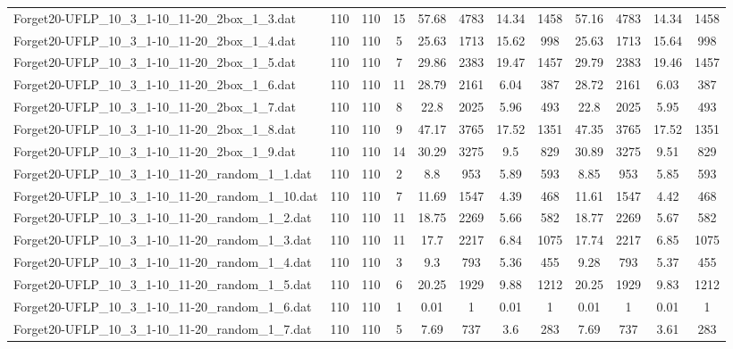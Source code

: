 \begin{sidewaystable}[!ht]
{\begin{tabular}{lccccccccccc}
Forget20-UFLP\_10\_3\_1-10\_11-20\_2box\_1\_3.dat & 110 & 110 & 15 & 57.68 & 4783 & 14.34 & 1458 & 57.16 & 4783 & 14.34 & 1458 \\
Forget20-UFLP\_10\_3\_1-10\_11-20\_2box\_1\_4.dat & 110 & 110 & 5 & 25.63 & 1713 & 15.62 & 998 & 25.63 & 1713 & 15.64 & 998 \\
Forget20-UFLP\_10\_3\_1-10\_11-20\_2box\_1\_5.dat & 110 & 110 & 7 & 29.86 & 2383 & 19.47 & 1457 & 29.79 & 2383 &  \textcolor{blue2}{19.46} & 1457 \\
Forget20-UFLP\_10\_3\_1-10\_11-20\_2box\_1\_6.dat & 110 & 110 & 11 & 28.79 & 2161 & 6.04 & 387 & 28.72 & 2161 & 6.03 & 387 \\
Forget20-UFLP\_10\_3\_1-10\_11-20\_2box\_1\_7.dat & 110 & 110 & 8 & 22.8 & 2025 & 5.96 & 493 & 22.8 & 2025 &  \textcolor{blue2}{5.95} & 493 \\
Forget20-UFLP\_10\_3\_1-10\_11-20\_2box\_1\_8.dat & 110 & 110 & 9 & 47.17 & 3765 &  \textcolor{blue2}{17.52} & 1351 & 47.35 & 3765 &  \textcolor{blue2}{17.52} & 1351 \\
Forget20-UFLP\_10\_3\_1-10\_11-20\_2box\_1\_9.dat & 110 & 110 & 14 & 30.29 & 3275 & 9.5 & 829 & 30.89 & 3275 & 9.51 & 829 \\
Forget20-UFLP\_10\_3\_1-10\_11-20\_random\_1\_1.dat & 110 & 110 & 2 & 8.8 & 953 & 5.89 & 593 & 8.85 & 953 &  \textcolor{blue2}{5.85} & 593 \\
Forget20-UFLP\_10\_3\_1-10\_11-20\_random\_1\_10.dat & 110 & 110 & 7 & 11.69 & 1547 & 4.39 & 468 & 11.61 & 1547 & 4.42 & 468 \\
Forget20-UFLP\_10\_3\_1-10\_11-20\_random\_1\_2.dat & 110 & 110 & 11 & 18.75 & 2269 & 5.66 & 582 & 18.77 & 2269 & 5.67 & 582 \\
Forget20-UFLP\_10\_3\_1-10\_11-20\_random\_1\_3.dat & 110 & 110 & 11 & 17.7 & 2217 & 6.84 & 1075 & 17.74 & 2217 & 6.85 & 1075 \\
Forget20-UFLP\_10\_3\_1-10\_11-20\_random\_1\_4.dat & 110 & 110 & 3 & 9.3 & 793 &  \textcolor{blue2}{5.36} & 455 & 9.28 & 793 & 5.37 & 455 \\
Forget20-UFLP\_10\_3\_1-10\_11-20\_random\_1\_5.dat & 110 & 110 & 6 & 20.25 & 1929 & 9.88 & 1212 & 20.25 & 1929 &  \textcolor{blue2}{9.83} & 1212 \\
Forget20-UFLP\_10\_3\_1-10\_11-20\_random\_1\_6.dat & 110 & 110 & 1 &  \textcolor{blue2}{0.01} & 1 &  \textcolor{blue2}{0.01} & 1 &  \textcolor{blue2}{0.01} & 1 &  \textcolor{blue2}{0.01} & 1 \\
Forget20-UFLP\_10\_3\_1-10\_11-20\_random\_1\_7.dat & 110 & 110 & 5 & 7.69 & 737 &  \textcolor{blue2}{3.6} & 283 & 7.69 & 737 & 3.61 & 283 \\

\end{tabular}}
\end{sidewaystable}
